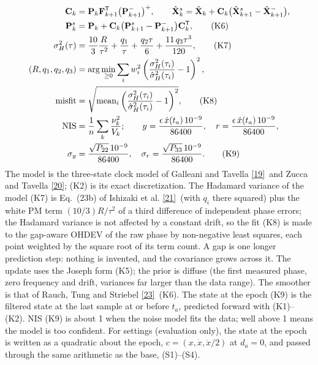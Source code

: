 \documentclass[11pt,a4paper]{article}
\newcommand{\galleani}{\href{https://doi.org/10.1109/MCS.2009.935568}{[19]}}
\newcommand{\zucca}{\href{https://doi.org/10.1109/TUFFC.2005.1406554}{[20]}}
\newcommand{\ishizaki}{\href{https://doi.org/10.1088/1681-7575/ad02fe}{[21]}}
\newcommand{\rts}{\href{https://doi.org/10.2514/3.3166}{[23]}}
\renewcommand{\_}{\usscore\allowbreak}
\begin{document}
\begin{align}
\mathbf C_k&=\mathbf P_k\mathbf F_{k+1}^{\mathsf T}\bigl(\mathbf P_{k+1}^-\bigr)^{+},\qquad
\hat{\mathbf X}_k^s=\hat{\mathbf X}_k+\mathbf C_k\bigl(\hat{\mathbf X}_{k+1}^s-\hat{\mathbf X}_{k+1}^-\bigr), \notag\\
\mathbf P_k^s&=\mathbf P_k+\mathbf C_k\bigl(\mathbf P_{k+1}^s-\mathbf P_{k+1}^-\bigr)\mathbf C_k^{\mathsf T}, \tag{K6}\label{eq:K6}\\
\sigma_H^2(\tau)&=\frac{10}{3}\frac{R}{\tau^2}+\frac{q_1}{\tau}+\frac{q_2\tau}{6}+\frac{11\,q_3\tau^3}{120}, \tag{K7}\label{eq:K7}\\
(R,q_1,q_2,q_3)&=\arg\min_{\ge0}\sum_i w_i^2\left(\frac{\sigma_H^2(\tau_i)}{\hat\sigma_H^2(\tau_i)}-1\right)^2, \notag\\
\text{misfit}&=\sqrt{\operatorname{mean}_i\left(\frac{\sigma_H^2(\tau_i)}{\hat\sigma_H^2(\tau_i)}-1\right)^2}, \tag{K8}\label{eq:K8}\\
\mathrm{NIS}&=\frac1n\sum_k\frac{\nu_k^2}{V_k};\qquad
y=\frac{\epsilon\,\dot x(t_a)\,10^{-9}}{86400},\quad r=\frac{\epsilon\,\ddot x(t_a)\,10^{-9}}{86400}, \notag\\
\sigma_y&=\frac{\sqrt{P_{22}}\,10^{-9}}{86400},\quad \sigma_r=\frac{\sqrt{P_{33}}\,10^{-9}}{86400}. \tag{K9}\label{eq:K9}
\end{align}
The model is the three-state clock model of Galleani and Tavella \galleani\ and Zucca and Tavella
\zucca; (K2) is its exact discretization. The Hadamard variance of the model (K7) is Eq.~(23b) of
Ishizaki et al. \ishizaki\ (with \(q_i\) there squared) plus the white PM term \((10/3)R/\tau^2\) of a
third difference of independent phase errors; the Hadamard variance is not affected by a constant drift,
so the fit (K8) is made to the gap-aware OHDEV of the raw phase by non-negative least squares, each point
weighted by the square root of its term count. A gap is one longer prediction step: nothing is invented,
and the covariance grows across it. The update uses the Joseph form (K5); the prior is diffuse (the first
measured phase, zero frequency and drift, variances far larger than the data range). The smoother is that of
Rauch, Tung and Striebel \rts\ (K6). The state at the epoch (K9) is the filtered state at the last sample
at or before \(t_a\), predicted forward with (K1)--(K2). NIS (K9) is about 1 when the noise model fits the
data; well above 1 means the model is too confident. For settings (evaluation only), the state at the epoch
is written as a quadratic about the epoch, \(c=(x,\dot x,\ddot x/2)\) at \(d_a=0\), and passed through the
same arithmetic as the base, (S1)--(S4).
\end{document}
